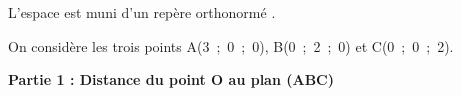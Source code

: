 
\medskip

L'espace est muni d'un repère orthonormé \Oijk.

On considère les trois points A(3~;~0~;~0), B(0~;~2~;~0) et C(0~;~0~;~2).


%

\bigskip

\textbf{Partie 1 : Distance du point O au plan (ABC)}

\medskip

